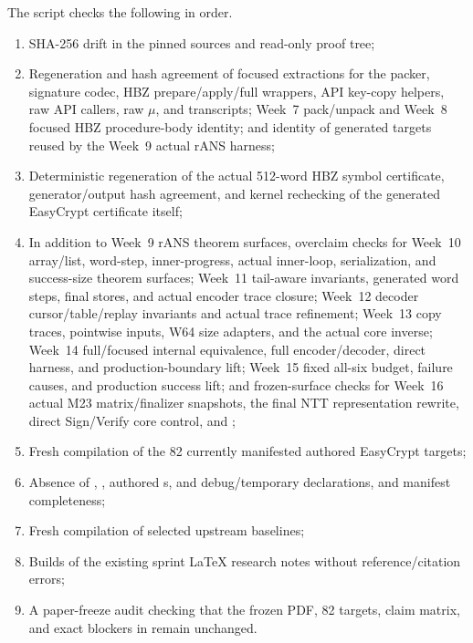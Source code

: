The script checks the following in order.

\begin{enumerate}
  \item SHA-256 drift in the pinned sources and read-only proof tree;
  \item Regeneration and hash agreement of focused extractions for the packer,
        signature codec, HBZ prepare/apply/full wrappers, API key-copy helpers,
        raw API callers, raw \(\mu\), and transcripts; Week~7 pack/unpack and
        Week~8 focused HBZ procedure-body identity; and identity of generated
        targets reused by the Week~9 actual rANS harness;
  \item Deterministic regeneration of the actual 512-word HBZ symbol certificate,
        generator/output hash agreement, and kernel rechecking of the generated
        EasyCrypt certificate itself;
  \item In addition to Week~9 rANS theorem surfaces, overclaim checks for Week~10
        array/list, word-step, inner-progress, actual inner-loop, serialization,
        and success-size theorem surfaces; Week~11 tail-aware invariants, generated
        word steps, final stores, and actual encoder trace closure; Week~12 decoder
        cursor/table/replay invariants and actual trace refinement; Week~13 copy
        traces, pointwise inputs, W64 size adapters, and the actual core inverse;
        Week~14 full/focused internal equivalence, full encoder/decoder, direct
        harness, and production-boundary lift; Week~15 fixed all-six budget,
        failure causes, and production success lift; and frozen-surface checks for
        Week~16 actual M23 matrix/finalizer snapshots, the final NTT representation
        rewrite, direct Sign/Verify core control, and ;
  \item Fresh  compilation of the 82 currently manifested
        authored EasyCrypt targets;
  \item Absence of , , authored
        s, and debug/temporary declarations, and manifest completeness;
  \item Fresh compilation of selected upstream baselines;
  \item Builds of the existing sprint LaTeX research notes without reference/citation errors;
  \item A paper-freeze audit checking that the frozen PDF, 82 targets, claim matrix,
        and exact blockers in  remain unchanged.
\end{enumerate}

